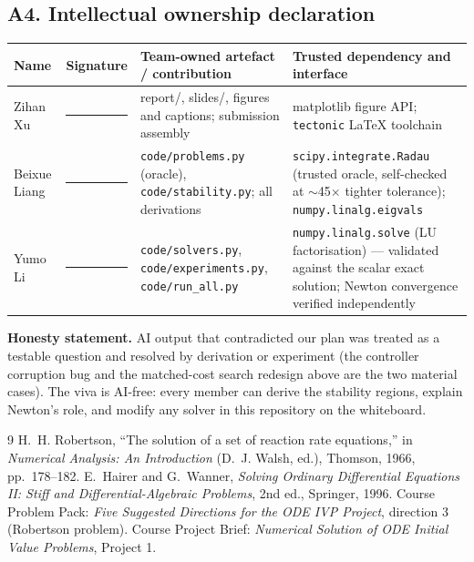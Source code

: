 ﻿\documentclass[11pt,a4paper]{article}
\begin{document}
\subsection*{A4. Intellectual ownership declaration}
\begin{center}
\begin{tabular}{@{}p{2.6cm}p{2.2cm}p{4.6cm}p{4.6cm}@{}}
\toprule
Name & Signature & Team-owned artefact / contribution & Trusted dependency and interface \\
\midrule
Zihan Xu & \rule{1.8cm}{0.4pt} &
report/, slides/, figures and captions; submission assembly &
matplotlib figure API; \texttt{tectonic} \LaTeX{} toolchain \\
\addlinespace
Beixue Liang & \rule{1.8cm}{0.4pt} &
\texttt{code/problems.py} (oracle), \texttt{code/stability.py}; all derivations &
\texttt{scipy.integrate.Radau} (trusted oracle, self-checked at
$\sim$45$\times$ tighter tolerance); \texttt{numpy.linalg.eigvals} \\
\addlinespace
Yumo Li & \rule{1.8cm}{0.4pt} &
\texttt{code/solvers.py}, \texttt{code/experiments.py}, \texttt{code/run\_all.py} &
\texttt{numpy.linalg.solve} (LU factorisation) --- validated against the
scalar exact solution; Newton convergence verified independently \\
\bottomrule
\end{tabular}
\end{center}

\medskip
\noindent\textbf{Honesty statement.}  AI output that contradicted our plan was
treated as a testable question and resolved by derivation or experiment (the
controller corruption bug and the matched-cost search redesign above are the
two material cases).  The viva is AI-free: every member can derive the
stability regions, explain Newton's role, and modify any solver in this
repository on the whiteboard.

\begin{thebibliography}{9}
 H.~H. Robertson, ``The solution of a set of reaction
rate equations,'' in \emph{Numerical Analysis: An Introduction}
(D.~J. Walsh, ed.), Thomson, 1966, pp.~178--182.
 E.~Hairer and G.~Wanner, \emph{Solving Ordinary
Differential Equations II: Stiff and Differential-Algebraic Problems},
2nd ed., Springer, 1996.
 Course Problem Pack: \emph{Five Suggested Directions for the
ODE IVP Project}, direction \textcircled{\scriptsize 3} (Robertson problem).
 Course Project Brief: \emph{Numerical Solution of ODE Initial
Value Problems}, Project 1.
\end{thebibliography}
\end{document}
